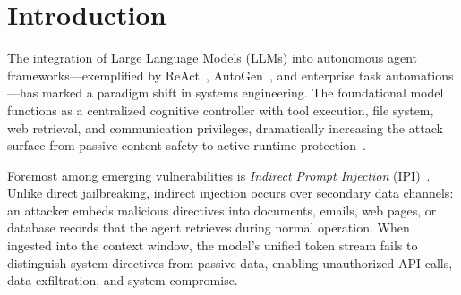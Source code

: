 \documentclass[runningheads]{llncs}
\begin{document}
\section{Introduction}
\label{sec:intro}

The integration of Large Language Models (LLMs) into autonomous agent frameworks---exemplified by ReAct~\cite{yao2023react}, AutoGen~\cite{wu2024autogen}, and enterprise task automations---has marked a paradigm shift in systems engineering. The foundational model functions as a centralized cognitive controller with tool execution, file system, web retrieval, and communication privileges, dramatically increasing the attack surface from passive content safety to active runtime protection~\cite{owasp2023,nist2023}.

Foremost among emerging vulnerabilities is \textit{Indirect Prompt Injection} (IPI)~\cite{greshake2023not,agentdojo2024}. Unlike direct jailbreaking, indirect injection occurs over secondary data channels: an attacker embeds malicious directives into documents, emails, web pages, or database records that the agent retrieves during normal operation. When ingested into the context window, the model's unified token stream fails to distinguish system directives from passive data, enabling unauthorized API calls, data exfiltration, and system compromise.
\end{document}
